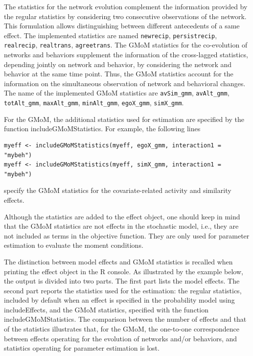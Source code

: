 \documentclass[a4paper,fleqn,11pt]{article}
\newcommand{\+}{\, + \,}
\newcommand{\sfn}[1]{\textsf{#1}}
\begin{document}
The statistics for the network evolution \citep{ASS2015}
complement the information provided by the regular statistics by
considering two consecutive observations of the network.
This formulation allows distinguishing between different antecedents of a same effect.
The implemented statistics are named \texttt{newrecip}, \texttt{persistrecip}, \texttt{realrecip},
\texttt{realtrans}, \texttt{agreetrans}.
The GMoM statistics for the co-evolution of networks and behaviors \citep{ASS2019}
supplement the information of the cross-lagged statistics, depending jointly
on network and behavior, by considering the network and behavior at the same time point.
Thus, the GMoM statistics account for the information on the simultaneous observation
of network and behavioral changes. The name of the implemented GMoM statistics
are \texttt{avSim\_gmm}, \texttt{avAlt\_gmm}, \texttt{totAlt\_gmm}, \texttt{maxAlt\_gmm},
\texttt{minAlt\_gmm}, \texttt{egoX\_gmm}, \texttt{simX\_gmm}.

For the GMoM, the additional statistics used for estimation are specified by
the function \sfn{includeGMoMStatistics}. For example, the following lines
\begin{verbatim}
myeff <- includeGMoMStatistics(myeff, egoX_gmm, interaction1 = "mybeh")
myeff <- includeGMoMStatistics(myeff, simX_gmm, interaction1 = "mybeh")
\end{verbatim}
specify the GMoM statistics for the covariate-related activity and similarity effects.

Although the statistics are added to the effect object,
one should keep in mind that the GMoM statistics are not effects
in the stochastic model, i.e., they are not
included as terms in the objective function.
They are only used for parameter estimation to evaluate the moment conditions.

The distinction between model effects
and GMoM statistics is recalled when printing the effect object in the R console.
As illustrated by the example below, the output is divided into two parts.
The first part lists the model effects.
The second part reports the statistics used for the estimation:
the regular statistics, included by default when an effect is specified
in the probability model using \sfn{includeEffects},
and the GMoM statistics, specified with the function \sfn{includeGMoMStatistics}.
The comparison between the number of effects and that of the statistics
illustrates that, for the GMoM, the one-to-one correspondence
between effects operating for the evolution of networks and/or behaviors,
and statistics operating for parameter estimation is lost.
\end{document}
